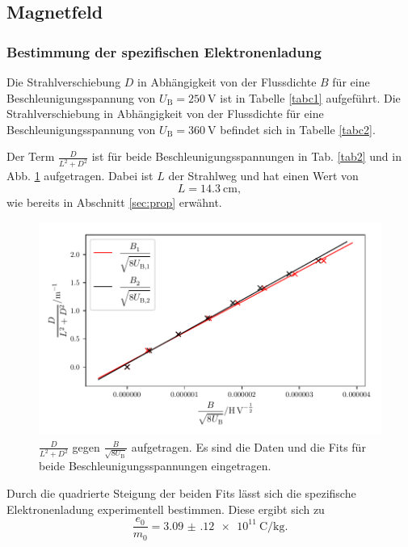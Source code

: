 \subsection{Magnetfeld}
\subsubsection{Bestimmung der spezifischen Elektronenladung}
Die Strahlverschiebung $D$ in Abhängigkeit von der Flussdichte $B$
für eine Beschleunigungsspannung von $U_\text{B} = \SI{250}{\volt}$
ist in Tabelle \ref{tabc1} aufgeführt. Die Strahlverschiebung in
Abhängigkeit von der Flussdichte für eine Beschleunigungsspannung
von $U_\text{B} = \SI{360}{\volt}$ befindet sich in Tabelle \ref{tabc2}.



\noindent Der Term $\frac{D}{L^2 + D^2}$ ist für beide Beschleunigungsspannungen
in Tab. \ref{tab2} und in Abb. \ref{fig:plot2} aufgetragen. Dabei ist $L$ der Strahlweg und
hat einen Wert von
\begin{equation*}
    L = \SI{14.3}{\centi\meter},
\end{equation*}
wie bereits in Abschnitt \ref{sec:prop} erwähnt.



\begin{figure}
    \centering
    \includegraphics[width=12cm, height=7cm]{build/plot2.pdf}
    \caption{$\frac{D}{L^2 + D^2}$ gegen $\frac{B}{\sqrt{8 U_\text{B}}}$ aufgetragen.
    Es sind die Daten und die Fits für beide Beschleunigungsspannungen
    eingetragen.}
    \label{fig:plot2}
\end{figure}

\noindent Durch die quadrierte Steigung der beiden Fits
lässt sich die spezifische Elektronenladung experimentell bestimmen.
Diese ergibt sich zu
\begin{equation*}
    \frac{e_0}{m_0} = \SI{3.09(12)e11}{\coulomb\per\kilogram}.
\end{equation*}

